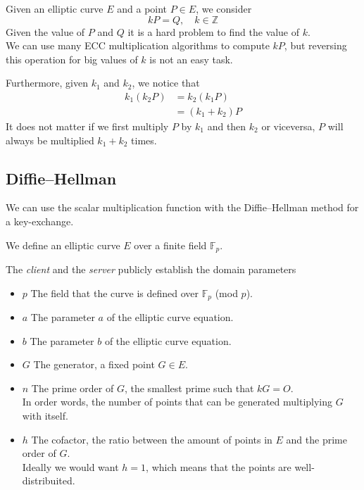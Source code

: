 \documentclass[a4paper]{article}
\begin{document}
Given an elliptic curve \(E\) and a point \(P\in E\), we consider
\[
	kP=Q,\quad
	k\in\mathbb{Z}
\]
Given the value of \(P\) and \(Q\) it is a hard problem to find the value of \(k\).\\
We can use many ECC multiplication algorithms to compute \(kP\), but reversing this operation for big values of \(k\) is not an easy task.

Furthermore, given \(k_1\) and \(k_2\), we notice that
\begin{align*}
	k_1(k_2P)&=k_2(k_1P)\\
	&=(k_1+k_2)P
\end{align*}
It does not matter if we first multiply \(P\) by \(k_1\) and then \(k_2\) or viceversa, \(P\) will always be multiplied \(k_1+k_2\) times.

\subsection{Diffie–Hellman}

We can use the scalar multiplication function with the Diffie–Hellman method for a key-exchange.

We define an elliptic curve \(E\) over a finite field \(\mathbb{F}_p\).

The \textit{client} and the \textit{server} publicly establish the domain parameters
\begin{itemize}
	\item \(p\) The field that the curve is defined over \(\mathbb{F}_p\) (mod \(p\)).
	\item \(a\) The parameter \(a\) of the elliptic curve equation.
	\item \(b\) The parameter \(b\) of the elliptic curve equation.
	\item \(G\) The generator, a fixed point \(G\in E\).
	\item \(n\) The prime order of \(G\), the smallest prime such that \(kG=O\).\\In order words, the number of points that can be generated multiplying \(G\) with itself.
	\item \(h\) The cofactor, the ratio between the amount of points in \(E\) and the prime order of \(G\).\\Ideally we would want \(h=1\), which means that the points are well-distribuited.
\end{itemize}
\end{document}
